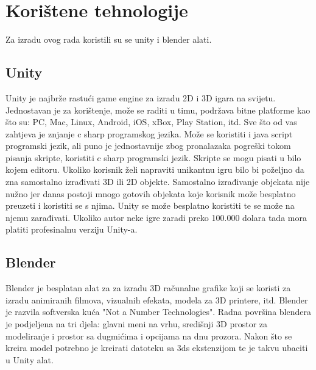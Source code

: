 \section{Korištene tehnologije}

Za izradu ovog rada koristili su se unity i blender alati. 
\subsection{Unity}

Unity je najbrže rastući game engine za izradu 2D i 3D igara na svijetu. Jednostavan je za korištenje, može se raditi u timu, podržava bitne platforme kao što su: PC, Mac, Linux, Android, iOS, xBox, Play Station, itd.
Sve što od vas zahtjeva je znjanje c sharp programskog jezika. Može se koristiti i java script programski jezik, ali puno je jednostavnije zbog pronalazaka pogreški tokom pisanja skripte, koristiti c sharp programski jezik. Skripte se mogu pisati u bilo kojem editoru. Ukoliko korisnik želi napraviti unikantnu igru bilo bi poželjno da zna samostalno izrađivati 3D ili 2D objekte. Samostalno izrađivanje objekata nije nužno jer danas postoji mnogo gotovih objekata koje korisnik može besplatno preuzeti i koristiti se s njima. 
Unity se može besplatno koristiti te se može na njemu zarađivati. Ukoliko autor neke igre zaradi preko 100.000 dolara tada mora platiti profesinalnu verziju Unity-a.

 
\subsection{Blender}

Blender je besplatan alat za za izradu 3D računalne grafike koji se koristi za izradu animiranih filmova, vizualnih efekata, modela za 3D printere, itd.
Blender je razvila softverska kuća "Not a Number Technologies". Radna površina blendera je podjeljena na tri djela: glavni meni na vrhu, središnji 3D prostor za modeliranje i prostor sa dugmićima i opcijama na dnu prozora. Nakon što se kreira model potrebno je kreirati datoteku sa 3ds ekstenzijom te je takvu ubaciti u Unity alat.